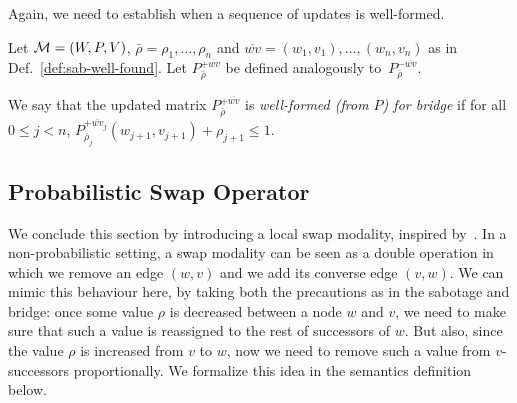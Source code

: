 Again, we need to establish when a sequence of updates is well-formed.

\begin{definition}
    \label{def:bridge-well-found}
    Let $\mathcal{M}=(W,P,V)$, $\bar{\rho}=\rho_1,\dots,\rho_n$ and ${\overline{wv}}=(w_1,v_1),\ldots,(w_n,v_n)$ as in Def.~\ref{def:sab-well-found}. Let $P^{+\overline{wv}}_{\bar{\rho}}$
    be defined analogously to~$P^{-\overline{wv}}_{\bar{\rho}}$. 

    We say that the updated matrix $P^{+\overline{wv}}_{\bar{\rho}}$ is \emph{well-formed (from $P$) for bridge} if for all $0\leq j < n$, $ P^{+{\overline{wv}}_j}_{\bar{\rho}_j}(w_{j+1},v_{j+1}) + \rho_{j+1}\leq 1$. 
\end{definition}

\subsection{Probabilistic Swap Operator}

We conclude this section by introducing a local swap modality, inspired by~\cite{ArecesFH14}. In a non-probabilistic setting, a swap modality can be seen as a double operation in which we remove an edge $(w,v)$ and we add its converse edge $(v,w)$. We can mimic this behaviour here, by taking both the precautions as in the sabotage and bridge: once some value $\rho$ is decreased between a node $w$ and $v$, we need to make sure that such a value is reassigned to the rest of successors of $w$. But also, since the value $\rho$ is increased from $v$ to $w$, now we need to remove such a value from $v$-successors proportionally. We formalize this idea in the semantics definition below.

